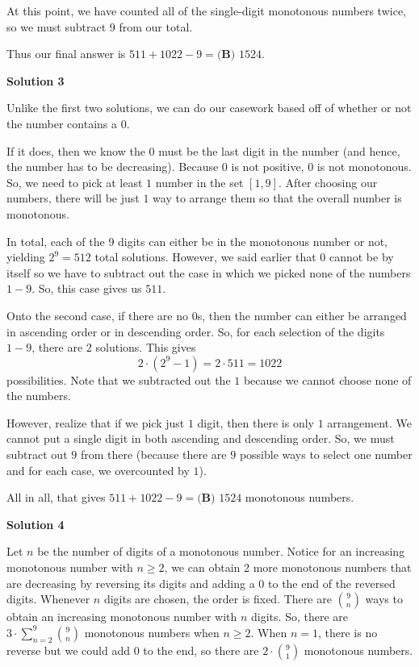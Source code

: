 \begin{enumerate}
 At this point, we have counted all of the single-digit monotonous numbers twice, so we must subtract 9 from our total.

 Thus our final answer is $511+1022-9 = \boxed{\textbf{(B) } 1524}$.

 



\textbf{Solution 3}

Unlike the first two solutions, we can do our casework based off of whether or not the number contains a $0$. 

 If it does, then we know the $0$ must be the last digit in the number (and hence, the number has to be decreasing). Because $0$ is not positive, $0$ is not monotonous. So, we need to pick at least $1$ number in the set $[1, 9].$ After choosing our numbers, there will be just $1$ way to arrange them so that the overall number is monotonous.

 In total, each of the $9$ digits can either be in the monotonous number or not, yielding $2^9 = 512$ total solutions. However, we said earlier that $0$ cannot be by itself so we have to subtract out the case in which we picked none of the numbers $1-9$. So, this case gives us $511$. 

 
Onto the second case, if there are no $0$s, then the number can either be arranged in ascending order or in descending order. So, for each selection of the digits $1- 9$, there are $2$ solutions. This gives 
 \[2 \cdot (2^9 - 1) = 2 \cdot 511 = 1022\] possibilities. Note that we subtracted out the $1$ because we cannot choose none of the numbers. 

 However, realize that if we pick just $1$ digit, then there is only $1$ arrangement. We cannot put a single digit in both ascending and descending order. So, we must subtract out $9$ from there (because there are $9$ possible ways to select one number and for each case, we overcounted by $1$). 

 All in all, that gives $511 + 1022 - 9 = \boxed{\textbf{(B)  } 1524}$ monotonous numbers.

 



\textbf{Solution 4}

Let $n$ be the number of digits of a monotonous number. Notice for an increasing monotonous number with $n \ge 2$, we can obtain 2 more monotonous numbers that are decreasing by reversing its digits and adding a $0$ to the end of the reversed digits. Whenever $n$ digits are chosen, the order is fixed. There are $\binom{9}{n}$ ways to obtain an increasing monotonous number with $n$ digits. So, there are $3\cdot \sum_{n=2}^{9} \binom{9}{n}$ monotonous numbers when $n \ge 2$. When $n=1$, there is no reverse but we could add $0$ to the end, so there are $2 \cdot \binom{9}{1}$ monotonous numbers.


\end{enumerate}
